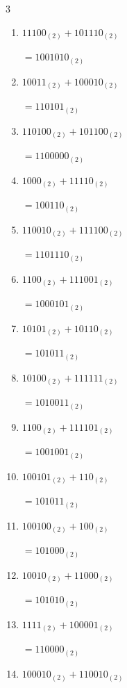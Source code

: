 \begin{multicols}{3}
\begin{enumerate}
  \itemsep=30pt
  \item $11100_{(2)} + 101110_{(2)}$

        $=1001010_{(2)}$

  \item $10011_{(2)} + 100010_{(2)}$

        $=110101_{(2)}$

  \item $110100_{(2)} + 101100_{(2)}$

        $=1100000_{(2)}$

  \item $1000_{(2)} + 11110_{(2)}$

        $=100110_{(2)}$

  \item $110010_{(2)} + 111100_{(2)}$

        $=1101110_{(2)}$

  \item $1100_{(2)} + 111001_{(2)}$

        $=1000101_{(2)}$

  \item $10101_{(2)} + 10110_{(2)}$

        $=101011_{(2)}$

  \item $10100_{(2)} + 111111_{(2)}$

        $=1010011_{(2)}$

  \item $1100_{(2)} + 111101_{(2)}$

        $=1001001_{(2)}$

  \item $100101_{(2)} + 110_{(2)}$

        $=101011_{(2)}$

\columnbreak %

  \item $100100_{(2)} + 100_{(2)}$

        $=101000_{(2)}$

  \item $10010_{(2)} + 11000_{(2)}$

        $=101010_{(2)}$

  \item $1111_{(2)} + 100001_{(2)}$

        $=110000_{(2)}$

  \item $100010_{(2)} + 110010_{(2)}$


\end{enumerate}
\end{multicols}
